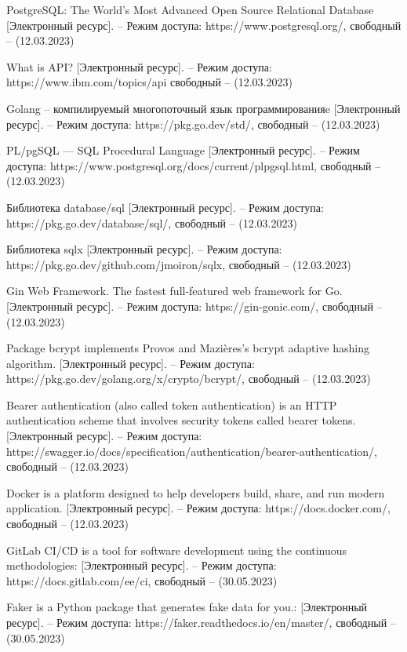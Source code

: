 \begin{thebibliography}{}
		PostgreSQL: The World's Most Advanced Open Source Relational Database  [Электронный ресурс]. -- Режим доступа: https://www.postgresql.org/,
		свободный -- (12.03.2023)
		
		
		What is API?  [Электронный ресурс]. -- Режим доступа: https://www.ibm.com/topics/api свободный -- (12.03.2023)
		 
		
		Golang -- компилируемый многопоточный язык программированияe  [Электронный ресурс]. -- Режим доступа: https://pkg.go.dev/std/, свободный -- (12.03.2023)
		
		PL/pgSQL — SQL Procedural Language [Электронный ресурс]. -- Режим доступа: https://www.postgresql.org/docs/current/plpgsql.html, свободный -- (12.03.2023)
		
		
		Библиотека database/sql [Электронный ресурс]. -- Режим доступа: https://pkg.go.dev/database/sql/,
		свободный -- (12.03.2023)
		
		Библиотека sqlx [Электронный ресурс]. -- Режим доступа: https://pkg.go.dev/github.com/jmoiron/sqlx,
		свободный -- (12.03.2023)
		
		Gin Web Framework. The fastest full-featured web framework for Go. [Электронный ресурс]. -- Режим доступа: https://gin-gonic.com/, свободный -- (12.03.2023)
		
		Package bcrypt implements Provos and Mazières's bcrypt adaptive hashing algorithm. [Электронный ресурс]. -- Режим доступа: https://pkg.go.dev/golang.org/x/crypto/bcrypt/, свободный -- (12.03.2023)
		
		Bearer authentication (also called token authentication) is an HTTP authentication scheme that involves security tokens called bearer tokens. [Электронный ресурс]. -- Режим доступа: https://swagger.io/docs/specification/authentication/bearer-authentication/, свободный -- (12.03.2023)
		
		Docker is a platform designed to help developers build, share, and run modern application. [Электронный ресурс]. -- Режим доступа: https://docs.docker.com/, свободный -- (12.03.2023)
		
		
		GitLab CI/CD is a tool for software development using the continuous methodologies: [Электронный ресурс]. -- Режим доступа: https://docs.gitlab.com/ee/ci,  свободный -- (30.05.2023)
		
		Faker is a Python package that generates fake data for you.: [Электронный ресурс]. -- Режим доступа: https://faker.readthedocs.io/en/master/,  свободный -- (30.05.2023)
	
	
	

\end{thebibliography}
\endgroup

\pagebreak